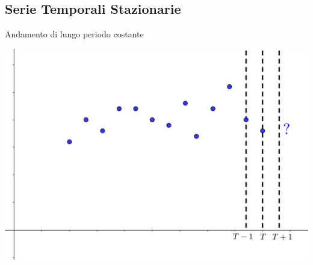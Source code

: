 \documentclass[12pt,a4paper]{article}
\begin{document}
\subsection{Serie Temporali Stazionarie}
Andamento di lungo periodo costante
\begin{center}
\includegraphics[width=0.5\columnwidth]{img/serie_temp_staz.png}\\
\end{center}
\end{document}
